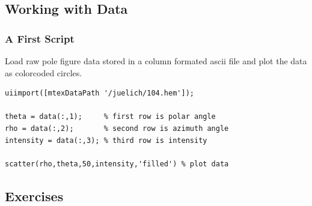 \subsection*{Working with Data}


\begin{frame}[fragile]
  \frametitle{A First Script}

Load raw pole figure data stored in a column formated ascii file and plot the
data as colorcoded circles.

\begin{lstlisting}
uiimport([mtexDataPath '/juelich/104.hem']);

theta = data(:,1);     % first row is polar angle
rho = data(:,2);       % second row is azimuth angle
intensity = data(:,3); % third row is intensity

scatter(rho,theta,50,intensity,'filled') % plot data

\end{lstlisting}


\end{frame}


\subsection*{Exercises}

